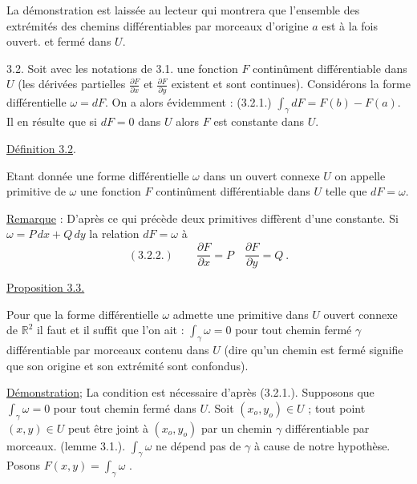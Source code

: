 
La démonstration est laissée au lecteur qui montrera que l'ensemble
des extrémités des chemins différentiables par morceaux d'origine $a$ est à
la fois ouvert. et fermé dans $U$.

3.2. Soit avec les notations de 3.1. une fonction $F$ continûment différentiable
dans $U$ (les dérivées partielles $\frac{\partial F}{\partial x}$ et $\frac{\partial F}{\partial y}$ existent et sont continues).
Considérons la forme différentielle $\omega = dF$. On a alors évidemment :
(3.2.1.) $\int_{\gamma} dF =$\unsure{;|}$F(b) - F(a)$. Il en résulte que si $dF = 0$ dans $U$
alors $F$ est constante dans $U$.

\uline{Définition 3.2}.

Etant donnée une forme différentielle $\omega$ dans un ouvert connexe $U$
on appelle primitive de $\omega$ une fonction $F$ continûment différentiable dans $U$
telle que $dF = \omega$.

\uline{Remarque} : D'après ce qui précède deux primitives diffèrent d'une constante.
Si $\omega = P\,dx + Q\,dy$ la relation $dF = \omega$  à
\[ (3.2.2.) \qquad \frac{\partial F}{\partial x} = P \quad \frac{\partial F}{\partial y} = Q \ . \]

\uline{Proposition 3.3.}

Pour que la forme différentielle $\omega$ admette une primitive dans $U$
ouvert connexe de $\mathbb{R}^2$ il faut et il suffit que l'on ait : $\int_{\gamma} \omega = 0$ pour
tout chemin fermé $\gamma$ différentiable par morceaux contenu dans $U$ (dire qu'un
chemin est fermé signifie que son origine et son extrémité sont confondus).

\uline{Démonstration}; La condition est nécessaire d'après (3.2.1.). Supposons que
$\int_{\gamma} \omega = 0$ pour tout chemin fermé dans $U$. Soit $(x_o,y_o) \in U$ ; tout point
$(x,y) \in U$ peut être joint à $(x_o,y_o)$ par un chemin $\gamma$ différentiable par
morceaux. (lemme 3.1.). $\int_{\gamma} \omega$ ne dépend pas de $\gamma$ à cause de notre hypothèse.
Posons $F(x,y) = \int_{\gamma} \omega$ .

